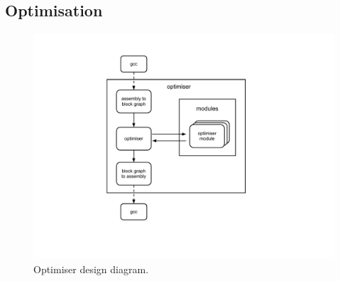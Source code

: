 \subsection*{Optimisation}



\begin{figure}[H]
\centering
\includegraphics[viewport= 170 90 510 490, clip=true]{diagram}
\caption{Optimiser design diagram.}
\label{fig:diagram}
\end{figure}

